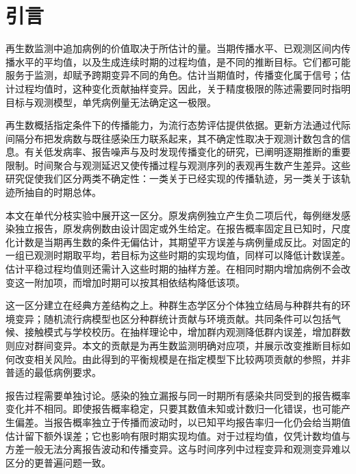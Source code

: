 \section{引言}
\label{sec:intro}

再生数监测中追加病例的价值取决于所估计的量。当期传播水平、已观测区间内传播水平的平均值，以及生成连续时期的过程均值，是不同的推断目标。它们都可能服务于监测，却赋予跨期变异不同的角色。估计当期值时，传播变化属于信号；估计过程均值时，这种变化贡献抽样变异。因此，关于精度极限的陈述需要同时指明目标与观测模型，单凭病例量无法确定这一极限。

再生数概括指定条件下的传播能力，为流行态势评估提供依据\citep{fraser2007estimating, gostic2020practical}。更新方法通过代际间隔分布把发病数与既往感染压力联系起来，其不确定性取决于观测计数包含的信息\citep{cori2013new, thompson2019improved}。有关低发病率、报告噪声与及时发现传播变化的研究，已阐明逐期推断的重要限制\citep{parag2021improved, parag2022quantifying, parag2025asymmetric}。时间聚合与观测延迟又使传播过程与观测序列的表观再生数产生差异\citep{nash2023estimating, ogigittins2024simulation, eales2024differences}。这些研究促使我们区分两类不确定性：一类关于已经实现的传播轨迹，另一类关于该轨迹所抽自的时期总体。

本文在单代分枝实验中展开这一区分。原发病例独立产生负二项后代，每例继发感染独立报告，原发病例数由设计固定或外生给定。在报告概率固定且已知时，尺度化计数是当期再生数的条件无偏估计，其期望平方误差与病例量成反比。对固定的一组已观测时期取平均，若目标为这些时期的实现均值，同样可以降低计数误差。估计平稳过程均值则还需计入这些时期的抽样方差。在相同时期内增加病例不会改变这一附加项，而增加时期可以按其相依结构降低该项。

这一区分建立在经典方差结构之上。种群生态学区分个体独立结局与种群共有的环境变异\citep{engen1998demographic, lande2003stochastic}；随机流行病模型也区分种群统计贡献与环境贡献\citep{breto2009time, he2010plug}。共同条件可以包括气候、接触模式与学校校历\citep{cauchemez2008estimating, shaman2009absolute}。在抽样理论中，增加群内观测降低群内误差，增加群数则应对群间变异\citep{cochran1977sampling, hayes1999simple}。本文的贡献是为再生数监测明确对应项，并展示改变推断目标如何改变相关风险。由此得到的平衡规模是在指定模型下比较两项贡献的参照，并非普适的最低病例要求。

报告过程需要单独讨论。感染的独立漏报与同一时期所有感染共同受到的报告概率变化并不相同\citep{azmon2014estimating, stoner2019hierarchical}。即使报告概率稳定，只要其数值未知或计数归一化错误，也可能产生偏差。当报告概率独立于传播而波动时，以已知平均报告率归一化仍会给当期值估计留下额外误差；它也影响有限时期实现均值。对于过程均值，仅凭计数均值与方差一般无法分离报告波动和传播变异。这与时间序列中过程变异和观测变异难以区分的更普遍问题一致\citep{knape2008estimability, augermethe2016state}。

